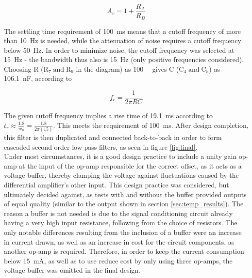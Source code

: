 $${A_v}=1+\frac{{R}_A}{R_B}$$

The settling time requirement of \SI{100}{ms} means that a cutoff frequency of more than \SI{10}{Hz} is needed, while the attenuation of noise requires a cutoff frequency below \SI{50}{Hz}. In order to minimize noise, the cutoff frequency was selected at \SI{15}{Hz} - the bandwidth thus also is \SI{15}{Hz} (only positive frequencies considered). Choosing R ($\mathrm{R_7 \; and \; R_9}$ in the diagram) as \SI{100}{\kilo\Omega} gives C ($\mathrm{C_4 \; and \; C_5}$) as \SI{106.1}{nF}, according to

$$f_c=\frac{1}{2 \pi RC}$$

The given cutoff frequency implies a rise time of \SI{19.1}{ms} according to $t_{r} \approx \frac{1.8}{w_{n}} = \frac{1.8}{2 \pi (15)}$\cite{cs}. This meets the requirement of \SI{100}{ms}. After design completion, this filter is then duplicated and connected back-to-back in order to form cascaded second-order low-pass filters, as seen in figure \ref{fig:final}.\\

Under most circumstances, it is a good design practice to include a unity gain op-amp at the input of the op-amp responsible for the correct offset, as it acts as a voltage buffer, thereby clamping the voltage against fluctuations caused by the differential amplifier's other input. This design practice was considered, but ultimately decided against, as tests with and without the buffer provided outputs of equal quality (similar to the output shown in section \ref{sec:temp_results}). The reason a buffer is not needed is due to the signal conditioning circuit already having a very high input resistance, following from the choice of resistors. The only notable differences resulting from the inclusion of a buffer were an increase in current drawn, as well as an increase in cost for the circuit components, as another op-amp is required. Therefore, in order to keep the current consumption below \SI{15}{mA}, as well as to use reduce cost by only using three op-amps, the voltage buffer was omitted in the final design. 


